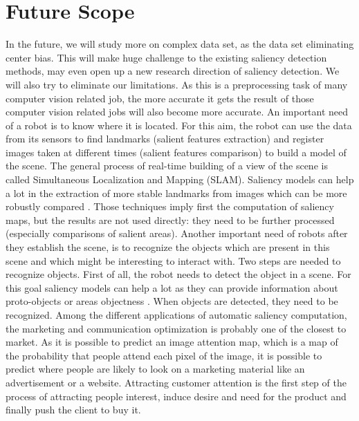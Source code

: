 \section{Future Scope}
In the future, we will study more on complex data set, as the data set eliminating center bias. This will make huge challenge to the existing saliency detection methods, may even open up a new research direction of saliency detection.
We will also try to eliminate  our limitations. As this is a preprocessing task of many computer vision related job, the more accurate it gets the result of those computer vision related jobs will also become more accurate.
\noindent
An important need of a robot is to know where it is located. For this aim, the robot can use the data from its sensors to find landmarks (salient features extraction) and register images taken at different times (salient features comparison) to build a model of the scene. The general process of real-time building of a view of the scene is called Simultaneous Localization and Mapping (SLAM). Saliency models can help a lot in the extraction of more stable landmarks from images which can be more robustly compared \cite{frintrop2008attentional}. Those techniques imply first the computation of saliency maps, but the results are not used directly: they need to be further processed (especially comparisons of salient areas).
Another important need of robots after they establish the scene, is to recognize the objects which are present in this scene and which might be interesting to interact with. Two steps are needed to recognize objects. First of all, the robot needs to detect the object in a scene. For this goal saliency models can help a lot as they can provide information about proto-objects or areas objectness . When objects are detected, they need to be recognized.
Among the different applications of automatic saliency computation, the marketing and communication optimization is probably one of the closest to market. As it is possible to predict an image attention map, which is a map of the probability that people attend each pixel of the image, it is possible to predict where people are likely to look on a marketing material like an advertisement or a website. Attracting customer attention is the first step of the process of attracting people interest, induce desire and need for the product and finally push the client to buy it.
